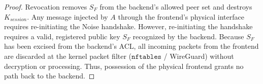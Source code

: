 \begin{proof}
Revocation removes $S_F$ from the backend's allowed peer set and destroys $K_{session}$. Any message injected by $A$ through the frontend's physical interface requires re-initiating the Noise handshake. However, re-initiating the handshake requires a valid, registered public key $S_F$ recognized by the backend. Because $S_F$ has been excised from the backend's ACL, all incoming packets from the frontend are discarded at the kernel packet filter ($\texttt{nftables}$ / WireGuard) without decryption or processing. Thus, possession of the physical frontend grants no path back to the backend.
\end{proof}
